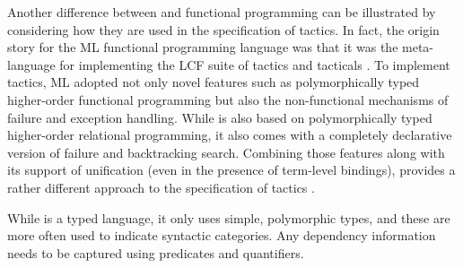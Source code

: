 Another difference between \lP and functional programming can be
illustrated by considering how they are used in the specification of
tactics.  In fact, the origin story for the ML functional programming
language was that it was the meta-language for implementing the LCF
suite of tactics and tacticals \cite{gordon79}.  To implement tactics,
ML adopted not only novel features such as polymorphically typed
higher-order functional programming but also the non-functional
mechanisms of failure and exception handling.  While \lP is also based
on polymorphically typed higher-order relational programming, it also
comes with a completely declarative version of failure and
backtracking search.  Combining those features along with its support
of unification (even in the presence of term-level bindings), \lP
provides a rather different approach to the specification of tactics
\cite{felty93jar}.


While \lP is a typed language, it only uses simple, polymorphic types,
and these are more often used to indicate syntactic categories.  Any
dependency information needs to be captured using predicates and
quantifiers.
